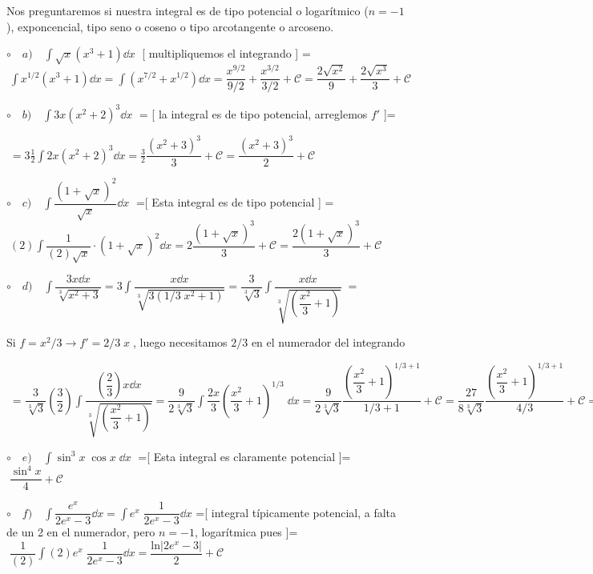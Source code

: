 \begin{proofw}\renewcommand{\qedsymbol}{$\diamond$}
	
Nos preguntaremos si nuestra integral es de tipo potencial o logarítmico ($n=-1$), exponcencial, tipo seno o coseno o tipo arcotangente o arcoseno. 

$\circ \quad  a) \quad \displaystyle \int \sqrt{x} (x^3+1) \dd x\; $ [ multipliquemos el integrando ] =$\; \displaystyle \int x^{1/2} (x^3+1) \dd x =\displaystyle \int  (x^{7/2}+x^{1/2}) \dd x= \dfrac {x^{9/2}}{9/2} + \dfrac {x^{3/2}}{3/2} + \mathcal C= \dfrac {2 \sqrt{x^2}}{9} + \dfrac {2 \sqrt{x^3}}{3} + \mathcal C$
	
$\circ \quad b) \quad \displaystyle \int 3x (x^2+2)^3 \dd x\; $ = [ la integral es de tipo potencial, arreglemos $f'$ ]=

$\; = \displaystyle 3  \frac 1 2 \int 2x (x^2+2)^3 \dd x= \frac 3 2 \dfrac {(x^2+3)^3}{3}+\mathcal C=\dfrac {(x^2+3)^3}{2}+\mathcal C$

$\circ \quad c) \quad \displaystyle \int \dfrac {(1+\sqrt x)^2}{\sqrt x} \dd x\; $ =[ Esta integral es de tipo potencial ] =
$\; \displaystyle (2) \int \dfrac {1} {(2)\sqrt{x}} \cdot  ( 1+\sqrt{x} )^2 \dd x = 2  \dfrac {( 1+\sqrt{x} )^3}{3}+\mathcal C=    \dfrac {2( 1+\sqrt{x} )^3}{3}+\mathcal C$

$\circ \quad d) \quad \displaystyle \int \dfrac {3x\dd x}{\sqrt[3]{x^2+3}}= 3 \displaystyle \int \dfrac {x\dd x}{\sqrt[3]{3(1/3\; x^2+1)}}=\dfrac {3} {\sqrt[3]{3}} \displaystyle \int \dfrac {x\dd x}{ \sqrt[3] {\left( \dfrac  {x^2}{3}+1 \right)}  }\;= $ 

Si $f=x^2/3 \to f'=2/3 \; x\;$, luego necesitamos $2/3$ en el numerador del integrando 
 
  $\; =  \dfrac {3} {\sqrt[3]{3}} \left( \dfrac 3 2 \right)  \displaystyle \int \dfrac {\left(\dfrac 2 3 \right)x\dd x}{ \sqrt[3] { \left( \dfrac  {x^2}{3}+1 \right) }  } = \dfrac {9}{2 \sqrt[3]{3} } \displaystyle \int \dfrac {2x}{3} \left(\dfrac {x^2}{3}+1  \right)^{1/3}\; \dd x= \dfrac {9}{2 \sqrt[3]{3} } \dfrac {\left(\dfrac {x^2}{3}+1  \right)^{1/3+1}}{1/3 + 1}+ \mathcal C= \dfrac {27}{8 \sqrt[3]{3} } \dfrac {\left(\dfrac {x^2}{3}+1  \right)^{1/3+1}}{4/3}+ \mathcal C=\dfrac {27}{ 8 \sqrt[3]{3} } \sqrt[3] { \left (\dfrac {x^2}{3} + 1  \right)^{4} } + \mathcal C $ 

$\circ \quad e) \quad \displaystyle \int \sin^3 x \; \cos x \; \dd x\; $ =[ Esta integral es claramente potencial ]= $\;  \dfrac {\sin^4 x}{4}+\mathcal C$

$\circ \quad f) \quad \displaystyle \int \dfrac {e^x}{2e^x-3} \dd x= \displaystyle \int e^x \; \dfrac {1}{2e^x-3} \dd x$ =\small{[ integral típicamente potencial, a falta de un 2 en el numerador, pero $n=-1$, logarítmica pues ]}=$ \; \dfrac {1}{(2)}\displaystyle \int (2) e^x \; \dfrac {1}{2e^x-3} \dd x= \dfrac {\mathrm{ln}|2e^x-3|}{2}+\mathcal C$ 
\end{proofw}

